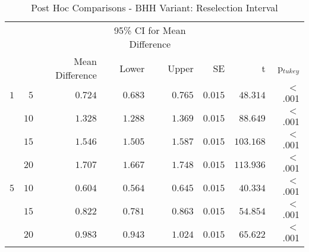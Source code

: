 \begin{table}[H]
	\centering
	\caption{Post Hoc Comparisons - BHH Variant: Reselection Interval}
	\label{tab:results:reselection:post_hoc}%
	\par\bigskip
	\resizebox{0.95\textwidth}{!}
	{
		\begin{tabular}{lrrrrrrr}
			\toprule
			\multicolumn{1}{c}{} & \multicolumn{1}{c}{} & \multicolumn{1}{c}{} & \multicolumn{2}{c}{95\% CI for Mean Difference} & \multicolumn{1}{c}{} & \multicolumn{1}{c}{} & \multicolumn{1}{c}{}               \\
			\cline{4-5}
			$ $                  & $ $                  & Mean Difference      & Lower                                           & Upper                & SE                   & t                    & p$_{tukey}$ \\
			\cmidrule[0.4pt]{1-8}
			$1$                  & $5$                  & $0.724$              & $0.683$                                         & $0.765$              & $0.015$              & $48.314$             & $<$ .001    \\
			$ $                  & $10$                 & $1.328$              & $1.288$                                         & $1.369$              & $0.015$              & $88.649$             & $<$ .001    \\
			                     & $15$                 & $1.546$              & $1.505$                                         & $1.587$              & $0.015$              & $103.168$            & $<$ .001    \\
			                     & $20$                 & $1.707$              & $1.667$                                         & $1.748$              & $0.015$              & $113.936$            & $<$ .001    \\
			$5$                  & $10$                 & $0.604$              & $0.564$                                         & $0.645$              & $0.015$              & $40.334$             & $<$ .001    \\
			$ $                  & $15$                 & $0.822$              & $0.781$                                         & $0.863$              & $0.015$              & $54.854$             & $<$ .001    \\
			                     & $20$                 & $0.983$              & $0.943$                                         & $1.024$              & $0.015$              & $65.622$             & $<$ .001    \\

\end{tabular}}
\end{table}
